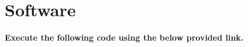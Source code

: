 \documentclass[12pt, a4paper]{article}
\begin{document}
\section{Software}
\textbf{Execute the following code using the below provided link.}\\
\begin{center}
\end{center}
 

\vspace{5mm}  


\end{document}
